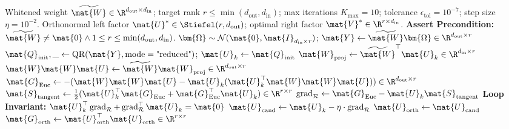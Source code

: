 \begin{algorithm}[H]
\caption[Householder Non-Commutative SVD (HNC-SVD)]{Householder Non-Commutative SVD (HNC-SVD)}
\label{alg:hnc_svd}
\begin{algorithmic}[1]
\REQUIRE Whitened weight $\widetilde{\mat{W}} \in \R^{d_{\text{out}} \times d_{\text{in}}}$; target rank $r \le \min(d_{\text{out}}, d_{\text{in}})$; max iterations $K_{\max} = 10$; tolerance $\epsilon_{\text{tol}} = 10^{-7}$; step size $\eta = 10^{-2}$.
\ENSURE Orthonormal left factor $\mat{U}^* \in \Stiefel(r, d_{\text{out}})$; optimal right factor $\mat{V}^* \in \R^{r \times d_{\text{in}}}$.
\STATE \textbf{Assert Precondition:} $\widetilde{\mat{W}} \ne \mat{0} \land 1 \le r \le \min(d_{\text{out}}, d_{\text{in}})$.
\STATE $\bm{\Omega} \sim \mathcal{N}(\mat{0}, \mat{I}_{d_{\text{in}} \times r})$; $\mat{Y} \leftarrow \widetilde{\mat{W}} \bm{\Omega} \in \R^{d_{\text{out}} \times r}$
\STATE $\mat{Q}_{\text{init}}, \_ \leftarrow \text{QR}(\mat{Y}, \text{mode}=\text{"reduced"})$; $\mat{U}_k \leftarrow \mat{Q}_{\text{init}}$
    \STATE {}
    \STATE $\mat{W}_{\text{proj}} \leftarrow \widetilde{\mat{W}}^\top \mat{U}_k \in \R^{d_{\text{in}} \times r}$
    \STATE $\mat{W}\mat{W}\mat{U} \leftarrow \widetilde{\mat{W}} \mat{W}_{\text{proj}} \in \R^{d_{\text{out}} \times r}$
    \STATE $\mat{G}_{\text{Euc}} \leftarrow - (\mat{W}\mat{W}\mat{U} - \mat{U}_k (\mat{U}_k^\top \mat{W}\mat{W}\mat{U})) \in \R^{d_{\text{out}} \times r}$
    \STATE {}
    \STATE $\mat{S}_{\text{tangent}} \leftarrow \frac{1}{2}(\mat{U}_k^\top \mat{G}_{\text{Euc}} + \mat{G}_{\text{Euc}}^\top \mat{U}_k) \in \R^{r \times r}$
    \STATE $\operatorname{grad}_{\mathcal{R}} \leftarrow \mat{G}_{\text{Euc}} - \mat{U}_k \mat{S}_{\text{tangent}}$
    \STATE \textbf{Loop Invariant:} $\mat{U}_k^\top \operatorname{grad}_{\mathcal{R}} + \operatorname{grad}_{\mathcal{R}}^\top \mat{U}_k = \mat{0}$
    \STATE $\mat{U}_{\text{cand}} \leftarrow \mat{U}_k - \eta \cdot \operatorname{grad}_{\mathcal{R}}$
    \STATE {}
    \STATE $\mat{U}_{\text{orth}} \leftarrow \mat{U}_{\text{cand}}$
        \STATE $\mat{G}_{\text{orth}} \leftarrow \mat{U}_{\text{orth}}^\top \mat{U}_{\text{orth}} \in \R^{r \times r}$

\end{algorithmic}
\end{algorithm}
